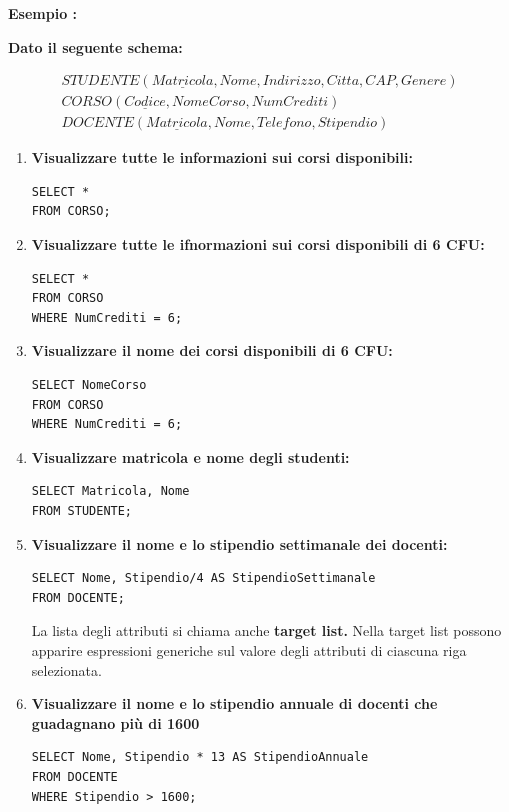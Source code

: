 \documentclass{article}
\newcounter{esempio}
\newenvironment{esempio}{
	\refstepcounter{esempio}%
	\noindent\textbf{Esempio \theesempio:}
}{\par}
\begin{document}
\begin{esempio}
	\textbf{Dato il seguente schema:}
\end{esempio}
\begin{align*}
	STUDENTE(\underline{Matricola}, Nome, Indirizzo, Citta, CAP, Genere) \\
	CORSO(\underline{Codice}, NomeCorso, NumCrediti)\\
	DOCENTE(\underline{Matricola}, Nome, Telefono, Stipendio)
\end{align*}

\begin{enumerate}
	\item \textbf{Visualizzare tutte le informazioni sui corsi disponibili:}
	\begin{lstlisting}[style=sqlstyle]
SELECT *
FROM CORSO;
	\end{lstlisting}
	
	\item \textbf{Visualizzare tutte le ifnormazioni sui corsi disponibili di 6 CFU:}
		\begin{lstlisting}[style=sqlstyle]
SELECT *
FROM CORSO
WHERE NumCrediti = 6;
	\end{lstlisting}
	\item \textbf{Visualizzare il nome dei corsi disponibili di 6 CFU:}
	\begin{lstlisting}[style=sqlstyle]
SELECT NomeCorso
FROM CORSO
WHERE NumCrediti = 6;
	\end{lstlisting} 
	\item \textbf{Visualizzare matricola e nome degli studenti:}
		\begin{lstlisting}[style=sqlstyle]
SELECT Matricola, Nome
FROM STUDENTE;
	\end{lstlisting} 
	\item \textbf{Visualizzare il nome e lo stipendio settimanale dei docenti:}
		\begin{lstlisting}[style=sqlstyle]
SELECT Nome, Stipendio/4 AS StipendioSettimanale
FROM DOCENTE;
	\end{lstlisting} 

La lista degli attributi si chiama anche\textbf{ target list.} Nella target list possono apparire espressioni generiche sul valore degli attributi di ciascuna riga selezionata. 

\item \textbf{Visualizzare il nome e lo stipendio annuale di docenti che guadagnano più di 1600}
\begin{lstlisting}[style=sqlstyle]
SELECT Nome, Stipendio * 13 AS StipendioAnnuale
FROM DOCENTE
WHERE Stipendio > 1600;
\end{lstlisting} 


\end{enumerate}
\end{document}
